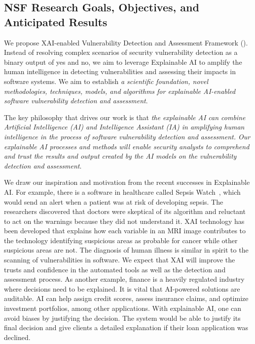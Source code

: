 \subsection{NSF Research Goals, Objectives, and Anticipated Results}

We propose XAI-enabled Vulnerability Detection and Assessment
Framework ({\tool}). Instead of resolving complex scenarios of
security vulnerability detection as a binary output of yes and no, we
aim to leverage Explainable AI to amplify the human intelligence in
detecting vulnerabilities and assessing their impacts in software
systems. We aim to establish {\em a scientific foundation, novel
  methodologies, techniques, models, and algorithms for
  explainable AI-enabled software vulnerability detection and
  assessment}.

\begin{center}
\begin{minipage}{36em}
The key philosophy that drives our work is that {\em the explainable
  AI can combine Artificial Intelligence (AI) and Intelligence Assistant (IA) in amplifying
  human intelligence in the process of software vulnerability
  detection and assessment. Our explainable AI processes and methods
  will enable security analysts to comprehend and trust the results
  and output created by the AI models on the vulnerability detection and
  assessment}.
    \end{minipage}
\end{center}

We draw our inspiration and motivation from the recent successes in
Explainable AI. For example, there is a software in healthcare called
Sepsis Watch~\cite{sepsis-watch}, which would send an alert when a
patient was at risk of developing sepsis. The researchers discovered
that doctors were skeptical of its algorithm and reluctant to act on
the warnings because they did not understand it. XAI technology has
been developed that explains how each variable in an MRI image
contributes to the technology identifying suspicious areas as probable
for cancer while other suspicious areas are not. The diagnosis of
human illness is similar in spirit to the scanning of vulnerabilities
in software.  We expect that XAI will improve the trusts and
confidence in the automated tools as well as the detection and
assessment process.  As another example, finance is a heavily
regulated industry where decisions need to be explained. It is vital
that AI-powered solutions are auditable. AI can help assign credit
scores, assess insurance claims, and optimize investment portfolios,
among other applications.  With explainable AI, one can avoid biases
by justifying the decision.  The system would be able to justify its
final decision and give clients a detailed explanation if their loan
application was declined.

